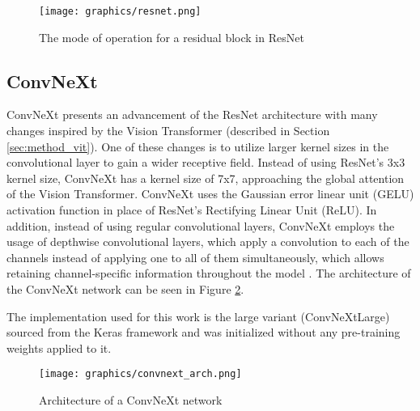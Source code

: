 \documentclass[draft,final]{vutinfth} %
\begin{document}
\begin{figure}[h]
    \centering
    \texttt{[image: graphics/resnet.png]}
    \caption{The mode of operation for a residual block in ResNet \cite{ruiz_understanding_2018, he_deep_2015}}
    \label{fig:resnet_block}
\end{figure}

\subsection{ConvNeXt} \label{sec:arch_convnext}
ConvNeXt presents an advancement of the ResNet architecture with many changes inspired by the Vision Transformer (described in Section \ref{sec:method_vit}). One of these changes is to utilize larger kernel sizes in the convolutional layer to gain a wider receptive field. Instead of using ResNet's 3x3 kernel size, ConvNeXt has a kernel size of 7x7, approaching the global attention of the Vision Transformer. ConvNeXt uses the Gaussian error linear unit (GELU) activation function in place of ResNet's Rectifying Linear Unit (ReLU). In addition, instead of using regular convolutional layers, ConvNeXt employs the usage of depthwise convolutional layers, which apply a convolution to each of the channels instead of applying one to all of them simultaneously, which allows retaining channel-specific information throughout the model \cite{pandey_depth-wise_2018, singh_convnext_2022}.
The architecture of the ConvNeXt network can be seen in Figure \ref{fig:arch_convnext}.

The implementation used for this work is the large variant (ConvNeXtLarge) sourced from the Keras framework \cite{chollet_keras_2015} and was initialized without any pre-training weights applied to it.

\begin{figure}
    \centering
    \texttt{[image: graphics/convnext\_arch.png]}
    \caption{Architecture of a ConvNeXt network \cite{chen_large-scale_2023}}
    \label{fig:arch_convnext}
\end{figure}
\end{document}
